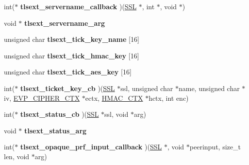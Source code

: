 \begin{DoxyCompactItemize}
int($\ast$ {\bfseries tlsext\+\_\+servername\+\_\+callback} )(\hyperlink{structssl__st}{S\+SL} $\ast$, int $\ast$, void $\ast$)
\item 
\mbox{\label{structssl__ctx__st_a2ab57baeccaab0b8d7ecc9c478f3ee14}} 
void $\ast$ {\bfseries tlsext\+\_\+servername\+\_\+arg}
\item 
\mbox{\label{structssl__ctx__st_a7f5cf468448dbbe1ae706c152d4abee5}} 
unsigned char {\bfseries tlsext\+\_\+tick\+\_\+key\+\_\+name} \mbox{[}16\mbox{]}
\item 
\mbox{\label{structssl__ctx__st_a3bbed4399466da935affa8b11dc37967}} 
unsigned char {\bfseries tlsext\+\_\+tick\+\_\+hmac\+\_\+key} \mbox{[}16\mbox{]}
\item 
\mbox{\label{structssl__ctx__st_ad6776ce4d46e74ca3580f34365c53b41}} 
unsigned char {\bfseries tlsext\+\_\+tick\+\_\+aes\+\_\+key} \mbox{[}16\mbox{]}
\item 
\mbox{\label{structssl__ctx__st_a87b05e20d2f45baa5f9a6ea0cd2d08c5}} 
int($\ast$ {\bfseries tlsext\+\_\+ticket\+\_\+key\+\_\+cb} )(\hyperlink{structssl__st}{S\+SL} $\ast$ssl, unsigned char $\ast$name, unsigned char $\ast$iv, \hyperlink{structevp__cipher__ctx__st}{E\+V\+P\+\_\+\+C\+I\+P\+H\+E\+R\+\_\+\+C\+TX} $\ast$ectx, \hyperlink{structhmac__ctx__st}{H\+M\+A\+C\+\_\+\+C\+TX} $\ast$hctx, int enc)
\item 
\mbox{\label{structssl__ctx__st_a950b7e9a873dcdd4af6363290e35d484}} 
int($\ast$ {\bfseries tlsext\+\_\+status\+\_\+cb} )(\hyperlink{structssl__st}{S\+SL} $\ast$ssl, void $\ast$arg)
\item 
\mbox{\label{structssl__ctx__st_a34c025b8e62d9ade63d51808d9271192}} 
void $\ast$ {\bfseries tlsext\+\_\+status\+\_\+arg}
\item 
\mbox{\label{structssl__ctx__st_a93fda87cb1a383657cbc973886b5a4c7}} 
int($\ast$ {\bfseries tlsext\+\_\+opaque\+\_\+prf\+\_\+input\+\_\+callback} )(\hyperlink{structssl__st}{S\+SL} $\ast$, void $\ast$peerinput, size\+\_\+t len, void $\ast$arg)
\item 
\mbox{\label{structssl__ctx__st_a256ac8f414a4bbf80a5ee4ca1f2df89c}} 

\end{DoxyCompactItemize}
